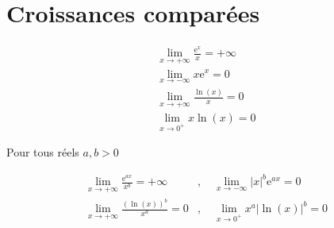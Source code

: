 \section{Croissances comparées}


\begin{align}
\lim _{x \rightarrow+\infty} \frac{\mathrm{e}^x}{x}=+\infty\\
\lim _{x \rightarrow-\infty} x \mathrm{e}^x=0 \\
\lim _{x \rightarrow+\infty} \frac{\ln (x)}{x}=0\\
\lim _{x \rightarrow 0^{+}} x \ln (x)=0
\end{align}


Pour tous réels  $a, b > 0$ 


\begin{align}
\lim _{x \rightarrow+\infty} \frac{\mathrm{e}^{a x}}{x^b}=+\infty &, \quad \lim _{x \rightarrow-\infty}|x|^b \mathrm{e}^{a x}=0 \\
\lim _{x \rightarrow+\infty} \frac{(\ln (x))^b}{x^a}=0 & , \quad \lim _{x \rightarrow 0^{+}} x^a|\ln (x)|^b=0
\end{align}
